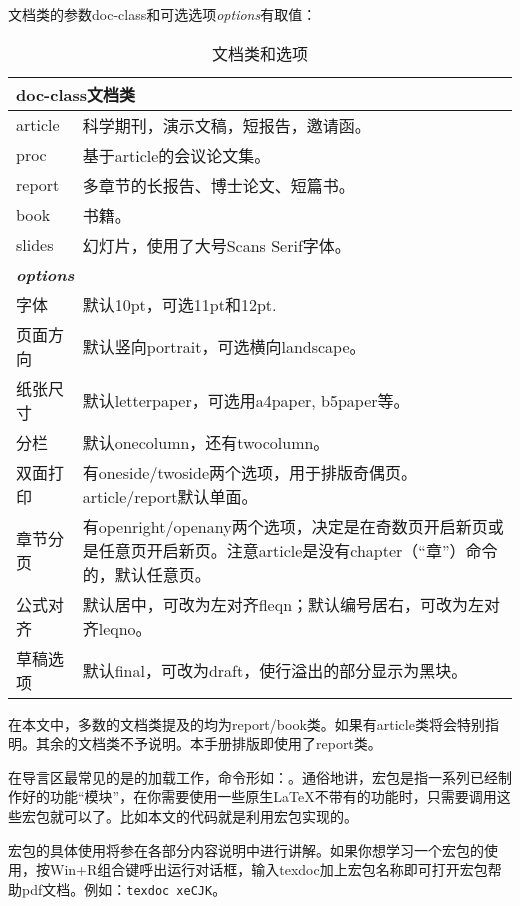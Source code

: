 文档类的参数doc-class和可选选项{\textit{options}}有取值：
\begin{table}[!htb]
    \centering
	\caption{文档类和选项}
	\label{tab:documentclass}
	\begin{tabular}{p{5em} @{\ -\ } p{24em}}
		\hline
		\multicolumn{2}{l}{\bfseries doc-class文档类\footnotemark} \\
		\hline
		article   & 科学期刊，演示文稿，短报告，邀请函。\\
		proc      & 基于article的会议论文集。\\
		report    & 多章节的长报告、博士论文、短篇书。\\
		book      & 书籍。\\
		slides    & 幻灯片，使用了大号Scans Serif字体。\\
		\hline
		\multicolumn{2}{l}{\bfseries\itshape options} \\
		\hline
		字体     & 默认10pt，可选11pt和12pt.\\
		页面方向 & 默认竖向portrait，可选横向landscape。\\
		纸张尺寸 & 默认letterpaper，可选用a4paper, b5paper等。\\
		分栏     & 默认onecolumn，还有twocolumn。\\
		双面打印 & 有oneside/twoside两个选项，用于排版奇偶页。article/report默认单面。\\
		章节分页 & 有openright/openany两个选项，决定是在奇数页开启新页或是任意页开启新页。注意article是没有chapter（``章''）命令的，默认任意页。\\
		公式对齐 & 默认居中，可改为左对齐fleqn；默认编号居右，可改为左对齐leqno。\\
		草稿选项 & 默认final，可改为draft，使行溢出的部分显示为黑块。\\
		\hline
	\end{tabular}
\end{table}

在本文中，多数的文档类提及的均为report/book类。如果有article类将会特别指明。其余的文档类不予说明。本手册排版即使用了report类。\dpar

在导言区最常见的是的加载工作，命令形如：。通俗地讲，宏包是指一系列已经制作好的功能``模块''，在你需要使用一些原生\LaTeX 不带有的功能时，只需要调用这些宏包就可以了。比如本文的代码就是利用宏包实现的。

宏包的具体使用将参在各部分内容说明中进行讲解。如果你想学习一个宏包的使用，按Win+R组合键呼出运行对话框，输入texdoc加上宏包名称即可打开宏包帮助pdf文档。例如：\verb|texdoc xeCJK|。

